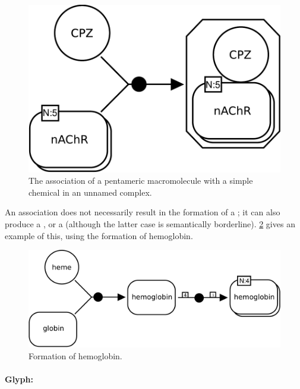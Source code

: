 \begin{figure}[H]
  \centering
  \includegraphics[scale = 0.3]{examples/association-unamed}
  \caption{The association of a pentameric macromolecule with a simple chemical in an unnamed complex.}
  \label{fig:assoc-unamed}
\end{figure}

An association does not necessarily result in the formation of a ; it can also produce a , or a  (although the latter case is semantically borderline).  \ref{fig:assoc-multi} gives an example of this, using the formation of hemoglobin.

\begin{figure}[H]
  \centering
  \includegraphics[scale = 0.3]{examples/association-multimerisation}
  \caption{Formation of hemoglobin.}
  \label{fig:assoc-multi}
\end{figure}

\paragraph{Glyph: }\label{sec:dissociation}

